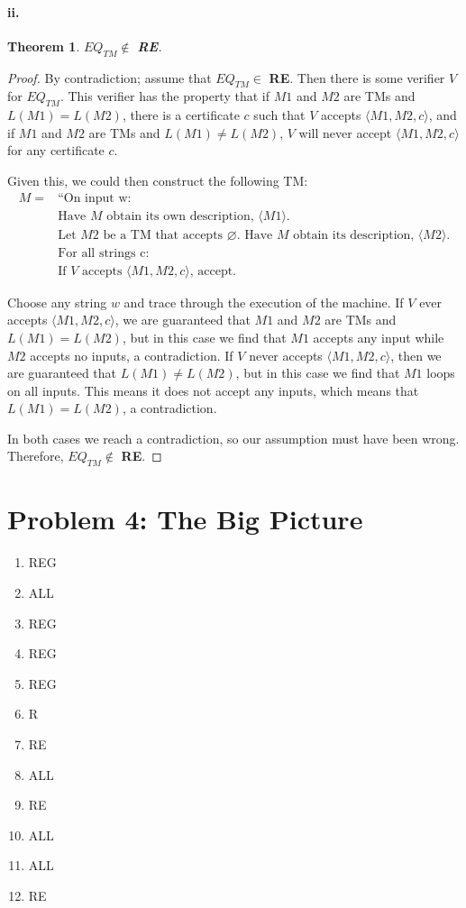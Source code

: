 \documentclass[10pt,letter]{article}
\newtheorem*{thm}{Theorem}
\begin{document}
\paragraph{ii.}
\begin{thm} $EQ_{TM} \not \in $ \textbf{RE}. \end{thm}
\begin{proof} 

By contradiction; assume that $EQ_{TM} \in$ \textbf{RE}. Then there is some verifier $V$ for $EQ_{TM}$. This verifier has the property that if $M1$ and $M2$ are TMs and $L(M1) = L(M2)$, there is a certificate $c$ such that $V$ accepts $\langle M1, M2, c \rangle$, and if $M1$ and $M2$ are TMs and $L(M1) \not = L(M2)$, $V$ will never accept $\langle M1, M2, c \rangle$ for any certificate $c$.

Given this, we could then construct the following TM:
\begin{align*}
M = &\text{“On input w:}\\
&\text{Have $M$ obtain its own description, $\langle M1 \rangle$.}\\
&\text{Let $M2$ be a TM that accepts $\varnothing$. Have $M$ obtain its description, $\langle M2 \rangle$.}\\
&\text{For all strings c:}\\
&\text{If $V$ accepts $\langle M1, M2, c \rangle$, accept.}
\end{align*}

Choose any string $w$ and trace through the execution of the machine. If $V$ ever accepts $\langle M1, M2, c \rangle$, we are guaranteed that $M1$ and $M2$ are TMs and $L(M1) = L(M2)$, but in this case we find that $M1$ accepts any input while $M2$ accepts no inputs, a contradiction. If $V$ never accepts $\langle M1, M2, c \rangle$, then we are guaranteed that $L(M1) \not = L(M2)$, but in this case we find that $M1$ loops on all inputs. This means it does not accept any inputs, which means that $L(M1) = L(M2)$, a contradiction.

In both cases we reach a contradiction, so our assumption must have been wrong. Therefore, $EQ_{TM} \not \in$ \textbf{RE}.
\end{proof}

\section*{Problem 4: The Big Picture}

\begin{enumerate}
\item[1.] REG
\item[2.] ALL
\item[3.] REG
\item[4.] REG
\item[5.] REG
\item[6.] R 
\item[7.] RE
\item[8.] ALL
\item[9.] RE
\item[10.] ALL
\item[11.] ALL
\item[12.] RE 
\end{enumerate}
\end{document}
